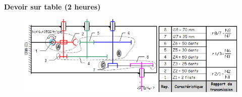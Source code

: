 \documentclass[a4paper,12pt]{article}
\begin{document}
\begin{center}
    \bfseries\Large Devoir sur table (2 heures)
\end{center}
\MesConsignes %
\bigskip




%
\begin{figure}[h]
  \includegraphics[width=\textwidth]{img_engrenages}
  \caption{}
  \label{}
\end{figure}
\end{document}
